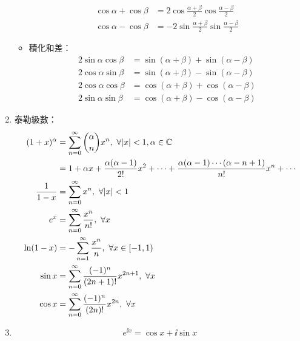 \begin{enumerate}
\begin{itemize}
\begin{subequations}
\begin{align}
                \cos\alpha + \cos\beta & = 2\cos\frac{\alpha + \beta}{2}\cos\frac{\alpha - \beta}{2} \\
                \cos\alpha - \cos\beta & = -2\sin\frac{\alpha + \beta}{2}\sin\frac{\alpha - \beta}{2}
            \end{align}
        \end{subequations}
        \item 積化和差： \begin{subequations}
            \begin{align}
                2\sin\alpha\cos\beta & = \sin(\alpha + \beta) + \sin(\alpha - \beta) \\
                2\cos\alpha\sin\beta & = \sin(\alpha + \beta) - \sin(\alpha - \beta) \\
                2\cos\alpha\cos\beta & = \cos(\alpha + \beta) + \cos(\alpha - \beta) \\
                2\sin\alpha\sin\beta & = \cos(\alpha + \beta) - \cos(\alpha - \beta)
            \end{align}
        \end{subequations}
    \end{itemize}
    \item 泰勒級數：\begin{subequations}
        \begin{align}
            (1 + x)^{\alpha} & = \sum_{n = 0}^{\infty}\binom{\alpha}{n}x^n, \ \forall |x| < 1, \alpha \in \C \\
            & = 1 + \alpha x + \frac{\alpha(\alpha - 1)}{2!}x^2 + \cdots + \frac{\alpha(\alpha - 1)\cdots(\alpha - n + 1)}{n!}x^n + \cdots \\
            \frac{1}{1 - x} & = \sum_{n = 0}^{\infty}x^n, \ \forall |x| < 1 \\
            e^x & = \sum_{n = 0}^{\infty}\frac{x^n}{n!}, \ \forall x \\
            \ln(1 - x) & = -\sum_{n = 1}^{\infty}\frac{x^n}{n}, \ \forall x \in [-1, 1) \\
            \sin x & = \sum_{n = 0}^{\infty}\frac{(-1)^n}{(2n + 1)!}x^{2n + 1}, \ \forall x \\
            \cos x & = \sum_{n = 0}^{\infty}\frac{(-1)^n}{(2n)!}x^{2n}, \ \forall x
        \end{align}
    \end{subequations}
    \item \begin{equation}
        e^{\ii x} = \cos x + \ii\sin x
    \end{equation}
\end{enumerate}

\pagebreak